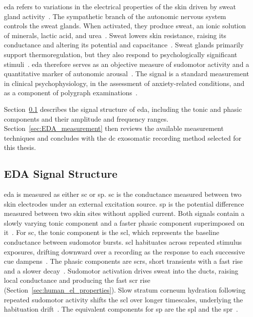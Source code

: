 \gls{eda} refers to variations in the electrical properties of the skin driven by sweat gland activity~\cite{bari_disturbances_2024}. The sympathetic branch of the autonomic nervous system controls the sweat glands. When activated, they produce sweat, an ionic solution of minerals, lactic acid, and urea~\cite{posada-quintero_innovations_2020}. Sweat lowers skin resistance, raising its conductance and altering its potential and capacitance~\cite{tronstad_current_2022}. Sweat glands primarily support thermoregulation, but they also respond to psychologically significant stimuli~\cite{cacioppo_handbook_2007}. \gls{eda} therefore serves as an objective measure of sudomotor activity and a quantitative marker of autonomic arousal~\cite{ellaway_sweat_2010, benedek_continuous_2010}. The signal is a standard measurement in clinical psychophysiology, in the assessment of anxiety-related conditions, and as a component of polygraph examinations~\cite{boucsein_electrodermal_2012, banganho_electrodermal_2022}.

Section~\ref{sec:EDA_signal} describes the signal structure of \gls{eda}, including the tonic and phasic components and their amplitude and frequency ranges. Section~\ref{sec:EDA_measurement} then reviews the available measurement techniques and concludes with the \gls{dc} exosomatic recording method selected for this thesis.

\subsection{EDA Signal Structure}\label{sec:EDA_signal}

\Gls{eda} is measured as either \gls{sc} or \gls{sp}. \Gls{sc} is the conductance measured between two skin electrodes under an external excitation source. \Gls{sp} is the potential difference measured between two skin sites without applied current. Both signals contain a slowly varying tonic component and a faster phasic component superimposed on it~\cite{boucsein_electrodermal_2012, tronstad_current_2022, banganho_electrodermal_2022}. For \gls{sc}, the tonic component is the \gls{scl}, which represents the baseline conductance between sudomotor bursts. \Gls{scl} habituates across repeated stimulus exposures, drifting downward over a recording as the response to each successive cue dampens~\cite{boucsein_electrodermal_2012}. The phasic components are \glspl{scr}, short transients with a fast rise and a slower decay~\cite{tronstad_current_2022, posada-quintero_innovations_2020}. Sudomotor activation drives sweat into the ducts, raising local conductance and producing the fast \gls{scr} rise (Section~\ref{sec:human_el_properties}). Slow stratum corneum hydration following repeated sudomotor activity shifts the \gls{scl} over longer timescales, underlying the habituation drift~\cite{boucsein_electrodermal_2012}. The equivalent components for \gls{sp} are the \gls{spl} and the \gls{spr}~\cite{tronstad_current_2022}.

